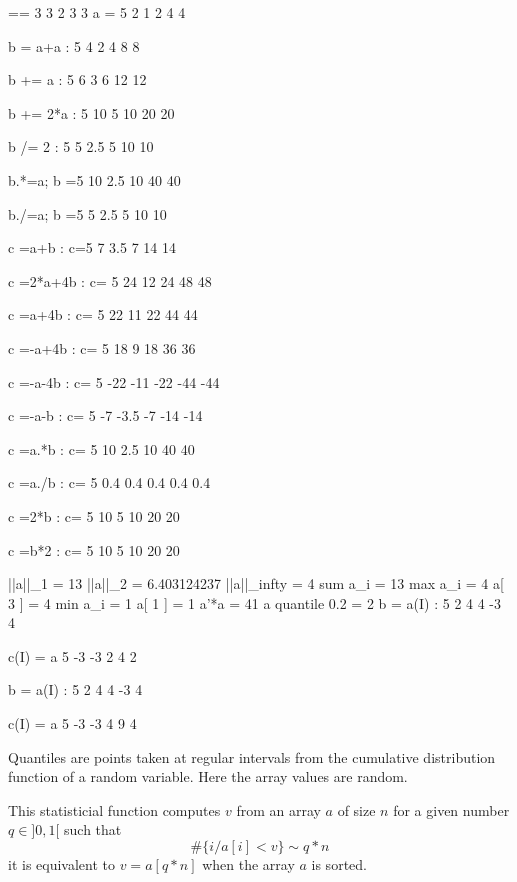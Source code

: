 \documentclass[a4paper,twoside,12pt]{book}
\begin{document}
==   3       3       2       3       3
 a = 5
          2       1       2       4       4

 b = a+a : 5
          4       2       4       8       8

 b += a : 5
          6       3       6      12      12

 b += 2*a : 5
         10       5      10      20      20

 b /= 2 : 5
          5     2.5       5      10      10

b.*=a; b =5
         10     2.5      10      40      40

b./=a; b =5
          5     2.5       5      10      10

 c =a+b : c=5
          7     3.5       7      14      14

 c =2*a+4b : c= 5
         24      12      24      48      48

 c =a+4b : c= 5
         22      11      22      44      44

 c =-a+4b : c= 5
         18       9      18      36      36

 c =-a-4b : c= 5
        -22     -11     -22     -44     -44

 c =-a-b : c= 5
         -7     -3.5     -7     -14     -14

 c =a.*b  : c= 5
         10     2.5      10      40      40

 c =a./b  : c= 5
        0.4     0.4     0.4     0.4     0.4

 c =2*b   : c= 5
         10       5      10      20      20

 c =b*2   : c= 5
         10       5      10      20      20

 ||a||_1     = 13
 ||a||_2     = 6.403124237
 ||a||_infty = 4
 sum a_i     = 13
 max a_i     = 4 a[  3 ] = 4
 min a_i     = 1 a[  1 ] = 1
 a'*a        = 41
 a quantile 0.2 = 2
 b = a(I) : 5	
	  2	  4	  4	 -3	  4
	
  c(I) = a 5	
	 -3	 -3	  2	  4	  2
	
 b = a(I) : 5	
	  2	  4	  4	 -3	  4
	
  c(I) = a 5	
	 -3	 -3	  4	  9	  4
\eFF

\begin{note}
Quantiles are points taken at regular intervals from the cumulative distribution function of a random variable. Here the
array values are random. 

This  statisticial function  computes $v$ from an array $a$ of size $n$ for a
given number $q\in ]0,1[$  such that
$$ \#\{ i / a[i] < v \} \sim q*n   $$
it is equivalent to
$  v = a[q*n]$   when the array $a$ is sorted.
\end{note}
\end{document}

